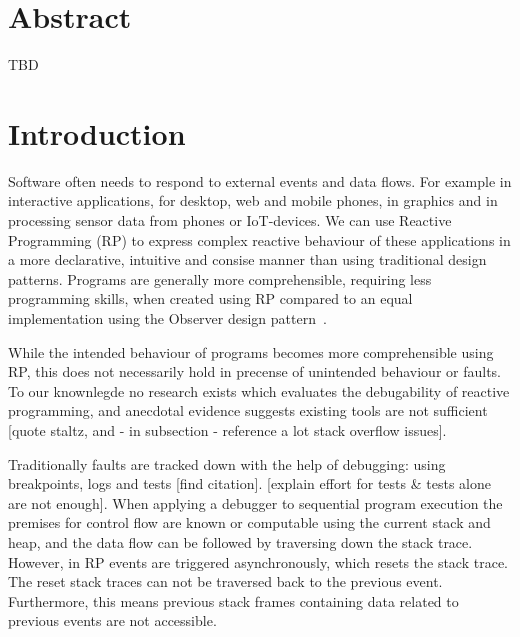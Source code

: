 \section{Abstract} TBD




\section{Introduction}%
\label{sec:intro} Software often needs to respond to external events and
data flows.  For example in interactive applications, for desktop, web
and mobile phones, in graphics and in processing sensor data from phones
or IoT-devices.  We can use Reactive Programming (RP) to express complex
reactive behaviour of these applications in a more declarative,
intuitive and consise manner than using traditional design patterns.
Programs are generally more comprehensible, requiring less programming
skills, when created using RP compared to an equal implementation using
the Observer design pattern~\cite{johnson1995design,
salvaneschi2014empirical}.

While the intended behaviour of programs becomes more comprehensible
using RP, this does not necessarily hold in precense of unintended
behaviour or faults. To our knownlegde no research exists which
evaluates the debugability of reactive programming, and anecdotal
evidence suggests existing tools are not sufficient [quote staltz, and -
in subsection - reference a lot stack overflow issues].

Traditionally faults are tracked down with the help of debugging:  using
breakpoints, logs and tests [find citation]. [explain effort for tests
\& tests alone are not enough]. When applying a debugger to sequential
program execution the premises for control flow are known or computable
using the current stack and heap, and the data flow can be followed by
traversing down the stack trace.  However, in RP events are triggered
asynchronously, which resets the stack trace.  The reset stack traces
can not be traversed back to the previous event.  Furthermore, this
means previous stack frames containing data related to previous events
are not accessible.

